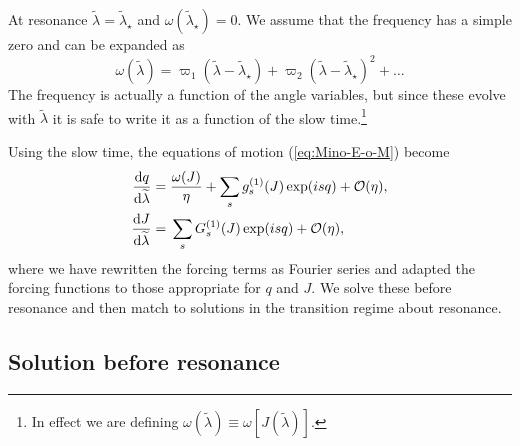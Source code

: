 At resonance $\widetilde{\lambda} = \widetilde{\lambda}_\star$ and $\omega\left(\widetilde{\lambda}_\star\right) = 0$. We assume that the frequency has a simple zero and can be expanded as
\begin{equation}
\omega\left(\widetilde{\lambda}\right) = \varpi_1\left(\widetilde{\lambda} - \widetilde{\lambda}_\star\right) + \varpi_2\left(\widetilde{\lambda} - \widetilde{\lambda}_\star\right)^2 + \ldots
\label{eq:omega-series}
\end{equation}
The frequency is actually a function of the angle variables, but since these evolve with $\widetilde{\lambda}$ it is safe to write it as a function of the slow time.\footnote{In effect we are defining $\omega\left(\tilde{\lambda}\right) \equiv \omega\left[J\left(\tilde{\lambda}\right)\right]$.}

Using the slow time, the equations of motion (\ref{eq:Mino-E-o-M}) become
\begin{subequations}
\begin{align}
\dfrac{\mathrm{d} {q}}{\mathrm{d} {\widetilde{\lambda}}} = {} & \dfrac{\omega(J)}{\eta} + \sum_s g_s^{(1)}(J)\exp(is q)  + \mathcal{O}({\eta}), \\
\dfrac{\mathrm{d} {J}}{\mathrm{d} {\widetilde{\lambda}}} = {} & \sum_s G_s^{(1)}(J)\exp(is q) + \mathcal{O}({\eta}),
\end{align}
\end{subequations}
where we have rewritten the forcing terms as Fourier series and adapted the forcing functions to those appropriate for $q$ and $J$. We solve these before resonance and then match to solutions in the transition regime about resonance.

\subsection{Solution before resonance}\label{sec:before-res}

